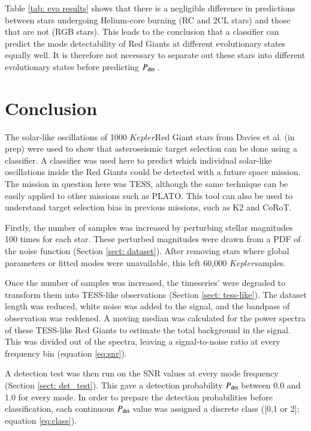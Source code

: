 \documentclass[a4paper,fleqn,usenatbib,useAMS]{mnras}
\newcommand{\kep}{\ensuremath{Kepler}\:}
\newcommand{\pdet}{\ensuremath{P_{\rm det}\:}}
\begin{document}
Table \ref{tab: evo results} shows that there is a negligible difference in predictions between stars undergoing Helium-core burning (RC and 2CL stars) and those that are not (RGB stars). This leads to the conclusion that a classifier can predict the mode detectability of Red Giants at different evolutionary states equally well. It is therefore not necessary to separate out these stars into different evolutionary states before predicting \pdet.


\section{Conclusion}
\label{sect: conc}

The solar-like oscillations of 1000 \kep Red Giant stars from Davies et al. (in prep) were used to show that asteroseismic target selection can be done using a classifier. A classifier was used here to predict which individual solar-like oscillations inside the Red Giants could be detected with a future space mission. The mission in question here was TESS, although the same technique can be easily applied to other missions such as PLATO. This tool can also be used to understand target selection bias in previous missions, such as K2 and CoRoT.


Firstly, the number of samples was increased by perturbing stellar magnitudes 100 times for each star. These perturbed magnitudes were drawn from a PDF of the noise function (Section \ref{sect: dataset}). After removing stars where global parameters or fitted modes were unavailable, this left 60,000 \kep samples. 

Once the number of samples was increased, the timeseries' were degraded to transform them into TESS-like observations (Section \ref{sect: tess-like}). The dataset length was reduced, white noise was added to the signal, and the bandpass of observation was reddened. A moving median was calculated for the power spectra of these TESS-like Red Giants to estimate the total background in the signal. This was divided out of the spectra, leaving a signal-to-noise ratio at every frequency bin (equation \ref{eq:snr}).

A detection test was then run on the SNR values at every mode frequency (Section \ref{sect: det_test}). This gave a detection probability \pdet between 0.0 and 1.0 for every mode. In order to prepare the detection probabilities before classification, each continuous \pdet value was assigned a discrete class ([0,1 or 2]; equation \ref{eq:class}).
\end{document}
